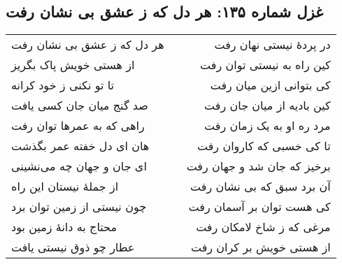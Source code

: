 \begin{center}
\section*{غزل شماره ۱۳۵: هر دل که ز عشق بی نشان رفت}
\label{sec:135}
\begin{longtable}{l p{0.5cm} r}
هر دل که ز عشق بی نشان رفت
&&
در پردهٔ نیستی نهان رفت
\\
از هستی خویش پاک بگریز
&&
کین راه به نیستی توان رفت
\\
تا تو نکنی ز خود کرانه
&&
کی بتوانی ازین میان رفت
\\
صد گنج میان جان کسی یافت
&&
کین بادیه از میان جان رفت
\\
راهی که به عمرها توان رفت
&&
مرد ره او به یک زمان رفت
\\
هان ای دل خفته عمر بگذشت
&&
تا کی خسبی که کاروان رفت
\\
ای جان و جهان چه می‌نشینی
&&
برخیز که جان شد و جهان رفت
\\
از جملهٔ نیستان این راه
&&
آن برد سبق که بی نشان رفت
\\
چون نیستی از زمین توان برد
&&
کی هست توان بر آسمان رفت
\\
محتاج به دانهٔ زمین بود
&&
مرغی که ز شاخ لامکان رفت
\\
عطار چو ذوق نیستی یافت
&&
از هستی خویش بر کران رفت
\\
\end{longtable}
\end{center}
